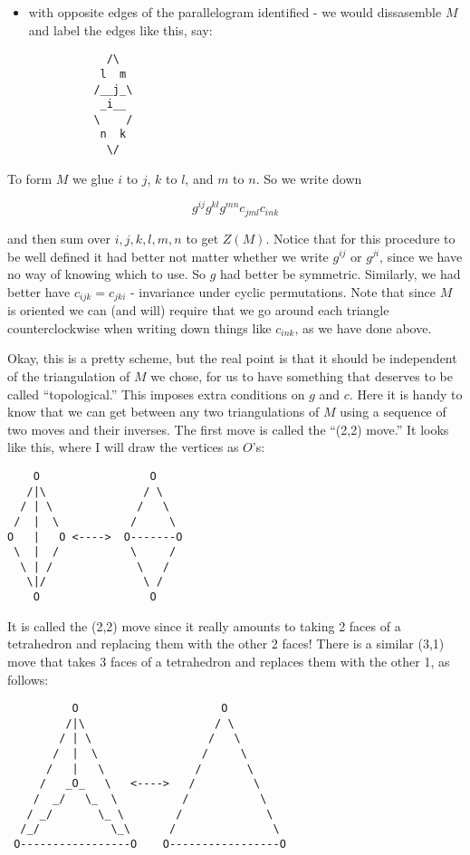\documentclass{article}
\begin{document}
\begin{itemize}
\item
  with opposite edges of the parallelogram identified - we would
  dissasemble \(M\) and label the edges like this, say:

\begin{verbatim}
            /\
           l  m
          /__j_\
           _i__
          \    /   
           n  k          
            \/     
\end{verbatim}
\end{itemize}

To form \(M\) we glue \(i\) to \(j\), \(k\) to \(l\), and \(m\) to
\(n\). So we write down

\[g^{ij}g^{kl}g^{mn}c_{jml}c_{ink}\]

and then sum over \(i,j,k,l,m,n\) to get \(Z(M)\). Notice that for this
procedure to be well defined it had better not matter whether we write
\(g^{ij}\) or \(g^{ji}\), since we have no way of knowing which to use.
So \(g\) had better be symmetric. Similarly, we had better have
\(c_{ijk} = c_{jki}\) - invariance under cyclic permutations. Note that
since \(M\) is oriented we can (and will) require that we go around each
triangle counterclockwise when writing down things like \(c_{ink}\), as
we have done above.

Okay, this is a pretty scheme, but the real point is that it should be
independent of the triangulation of \(M\) we chose, for us to have
something that deserves to be called ``topological.'' This imposes extra
conditions on \(g\) and \(c\). Here it is handy to know that we can get
between any two triangulations of \(M\) using a sequence of two moves
and their inverses. The first move is called the ``(2,2) move.'' It
looks like this, where I will draw the vertices as \(O\)'s:

\begin{verbatim}
    O                 O
   /|\               / \    
  / | \             /   \  
 /  |  \           /     \ 
O   |   O <---->  O-------O
 \  |  /           \     /   
  \ | /             \   /          
   \|/               \ /     
    O                 O
\end{verbatim}

It is called the (2,2) move since it really amounts to taking 2 faces of
a tetrahedron and replacing them with the other 2 faces! There is a
similar (3,1) move that takes 3 faces of a tetrahedron and replaces them
with the other 1, as follows:

\begin{verbatim}
          O                      O
         /|\                    / \
        / | \                  /   \
       /  |  \                /     \
      /   |   \              /       \
     /   _O_   \   <---->   /         \
    /  _/   \_  \          /           \
   / _/       \_ \        /             \
  /_/           \_\      /               \
 O-----------------O    O-----------------O
\end{verbatim}
\end{document}
